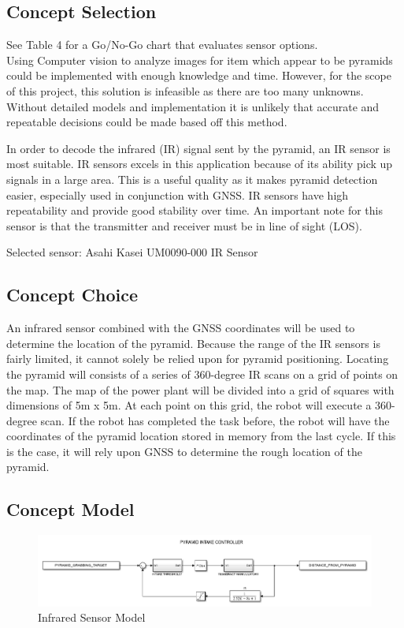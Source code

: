 \documentclass[12pt]{article}
\begin{document}
\subsection{Concept Selection}
See Table 4 for a Go/No-Go chart that evaluates sensor options.\\ 

Using Computer vision to analyze images for item which appear to be pyramids could be implemented with enough knowledge and time. However, for the scope of this project, this solution is infeasible as there are too many unknowns. Without detailed models and implementation it is unlikely that accurate and repeatable decisions could be made based off this method.

In order to decode the infrared (IR) signal sent by the pyramid, an IR sensor is most suitable.  IR sensors excels in this application because of its ability pick up signals in a large area. This is a useful quality as it makes pyramid detection easier, especially used in conjunction with GNSS. IR sensors have high repeatability and provide good stability over time. An important note for this sensor is that the transmitter and receiver must be in line of sight (LOS). 

Selected sensor: Asahi Kasei UM0090-000 IR Sensor

\subsection{Concept Choice}
An infrared sensor combined with the GNSS coordinates will be used to determine the location of the pyramid. Because the range of the IR sensors is fairly limited, it cannot solely be relied upon for pyramid positioning. Locating the pyramid will consists of a series of 360-degree IR scans on a grid of points on the map. The map of the power plant will be divided into a grid of squares with dimensions of 5m x 5m. At each point on this grid, the robot will execute a 360-degree scan. If the robot has completed the task before, the robot will have the coordinates of the pyramid location stored in memory from the last cycle. If this is the case, it will rely upon GNSS to determine the rough location of the pyramid. 


\subsection{Concept Model}
\begin{figure}[htb!]
\begin{center}
\caption{Infrared Sensor Model}
\includegraphics[scale=0.6]{Figures/simulink_pyramid}
\end{center}
\end{figure}
\FloatBarrier
\end{document}
